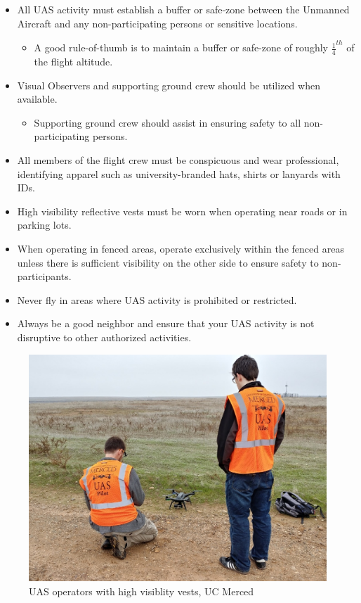 \documentclass[
]{book}
\providecommand{\tightlist}{%
  \setlength{\itemsep}{0pt}\setlength{\parskip}{0pt}}
\begin{document}
\begin{itemize}
\tightlist
\item
  All UAS activity must establish a buffer or safe-zone between the Unmanned Aircraft and any non-participating persons or sensitive locations.

  \begin{itemize}
  \tightlist
  \item
    A good rule-of-thumb is to maintain a buffer or safe-zone of roughly \(\frac{1}{4}^{th}\) of the flight altitude.
  \end{itemize}
\item
  Visual Observers and supporting ground crew should be utilized when available.

  \begin{itemize}
  \tightlist
  \item
    Supporting ground crew should assist in ensuring safety to all non-participating persons.
  \end{itemize}
\item
  All members of the flight crew must be conspicuous and wear professional, identifying apparel such as university-branded hats, shirts or lanyards with IDs.
\item
  High visibility reflective vests must be worn when operating near roads or in parking lots.\\
\item
  When operating in fenced areas, operate exclusively within the fenced areas unless there is sufficient visibility on the other side to ensure safety to non-participants.
\item
  Never fly in areas where UAS activity is prohibited or restricted.
\item
  Always be a good neighbor and ensure that your UAS activity is not disruptive to other authorized activities.
\end{itemize}

\begin{figure}

{\centering \includegraphics[width=0.75\linewidth]{images/UAS_vest} 

}

\caption{UAS operators with high visiblity vests, UC Merced}\label{fig:hivis}
\end{figure}
\end{document}
